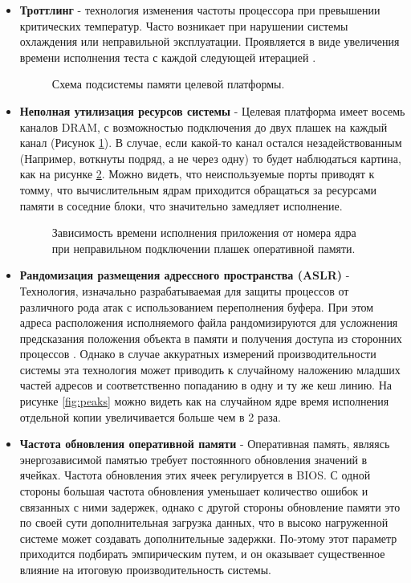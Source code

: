 \begin{itemize}
	\item  \textbf{Троттлинг} - технология изменения частоты процессора при превышении критических температур. Часто возникает при нарушении системы охлаждения или неправильной эксплуатации. Проявляется в виде увеличения времени исполнения теста с каждой следующей итерацией \cite{zhang2009hardware}.
		\begin{figure}[ht]
		\caption{Схема подсистемы памяти целевой платформы.}\label{fig:ddrsvg1}
	\end{figure}
	\item  \textbf{Неполная утилизация ресурсов системы} - Целевая платформа имеет восемь каналов DRAM, с возможностью подключения до двух плашек на каждый канал (Рисунок \ref{fig:ddrsvg1}). В случае, если какой-то канал остался незадействованным (Например, воткнуты подряд, а не через одну) то будет наблюдаться картина, как на рисунке \ref{fig:lack_of_memmory}. Можно видеть, что неиспользуемые порты приводят к томму, что вычислительным ядрам приходится обращаться за ресурсами памяти в соседние блоки, что значительно замедляет исполнение.

	
	\begin{figure}[ht]
		\caption{Зависимость времени исполнения приложения от номера ядра при неправильном подключении плашек оперативной памяти.}\label{fig:lack_of_memmory}
	\end{figure}
	\item \textbf{Рандомизация размещения адрессного пространства (ASLR)} - Технология, изначально разрабатываемая для защиты процессов от различного рода атак с использованием  переполнения буфера. При этом  адреса расположения исполняемого файла рандомизируются для усложнения предсказания положения объекта в памяти и получения доступа из сторонних процессов \cite{gras2017aslr}. Однако в случае аккуратных измерений производительности системы эта технология может приводить к случайному наложению младших частей адресов и соответственно попаданию в одну и ту же кеш линию. На рисунке \ref{fig:peaks}  можно видеть как на случайном ядре время исполнения отдельной копии увеличивается больше чем в 2 раза.
	\item \textbf{Частота обновления оперативной памяти} - Оперативная память, являясь энергозависимой памятью требует постоянного обновления значений в ячейках. Частота обновления этих ячеек регулируется в BIOS. С одной стороны большая частота обновления уменьшает количество ошибок и связанных с ними задержек, однако с другой стороны обновление памяти это по своей сути дополнительная загрузка данных, что в высоко нагруженной системе может создавать дополнительные задержки. По-этому этот параметр приходится подбирать эмпирическим путем, и он оказывает существенное влияние на итоговую производительность системы.
	

\end{itemize}
